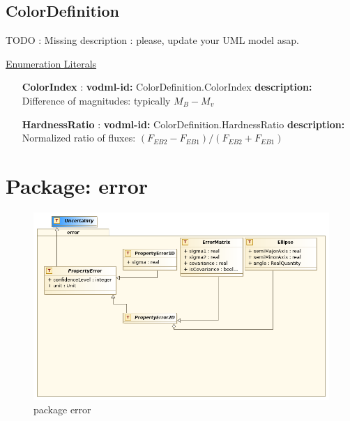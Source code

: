   \subsection{ColorDefinition}
  \label{sect:ColorDefinition}

  TODO : Missing description : please, update your UML model asap.

  \noindent \underline{Enumeration Literals}
  \vspace{-\parsep}
  \small
  \begin{itemize}
  
    \item[\textbf{ColorIndex}]: \textbf{vodml-id:} ColorDefinition.ColorIndex \newline
          \textbf{description:} Difference of magnitudes: typically $M_B - M_v$
    \item[\textbf{HardnessRatio}]: \textbf{vodml-id:} ColorDefinition.HardnessRatio \newline
          \textbf{description:} Normalized ratio of fluxes: $(F_{EB2} - F_{EB1}) / (F_{EB2} + F_{EB1})$
  \end{itemize}
  \normalsize


\pagebreak
\section{Package: error }
  \begin{figure}[h]
    \includegraphics[width=1.0\textwidth]{../model/error.png}
    \caption{package error}
    \label{fig:error}
  \end{figure}





